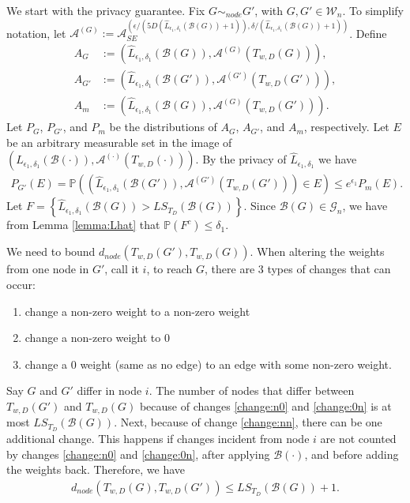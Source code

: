 \documentclass{article}
\begin{document}
We start with the privacy guarantee. Fix $G \sim_{node} G'$, with $G, G' \in \mathcal{W}_n$. To simplify notation, let $\mathcal{A}^{(G)} := \mathcal{A}_{SE}^{(\epsilon/(5D(\hat{L}_{\epsilon_1, \delta_1}(\mathcal{B}(G)) + 1)), \delta/(\hat{L}_{\epsilon_1, \delta_1}(\mathcal{B}(G)) + 1))}$. Define
\begin{align*}
A_G & := (\hat{L}_{\epsilon_1, \delta_1}(\mathcal{B}(G)), \mathcal{A}^{(G)}(T_{w, D}(G))), \\
%
A_{G'} & := (\hat{L}_{\epsilon_1, \delta_1}(\mathcal{B}(G')), \mathcal{A}^{(G')}(T_{w, D}(G'))), \\
%
A_m & := (\hat{L}_{\epsilon_1, \delta_1}(\mathcal{B}(G)), \mathcal{A}^{(G)}(T_{w, D}(G'))).
\end{align*}
Let $P_G$, $P_{G'}$, and $P_m$ be the distributions of $A_G$, $A_{G'}$, and $A_m$, respectively. 
Let $E$ be an arbitrary measurable set in the image of $(\hat{L}_{\epsilon_1, \delta_1}(\mathcal{B}(\cdot)), \mathcal{A}^{(\cdot)}( T_{w, D}(\cdot)))$. By the privacy of $\hat{L}_{\epsilon_1, \delta_1}$ we have
\begin{align*}
P_{G'}(E) = \mathbb{P}\left((\hat{L}_{\epsilon_1, \delta_1}(\mathcal{B}(G')), \mathcal{A}^{(G')}(T_{w,D}(G'))) \in E\right) \leq e^{\epsilon_1}P_m(E). 
\end{align*}
Let $F = \left\{\hat{L}_{\epsilon_1, \delta_1}(\mathcal{B}(G)) > LS_{T_{D}}(\mathcal{B}(G))\right\}$. Since $\mathcal{B}(G) \in \mathcal{G}_n$, we have from Lemma \ref{lemma:Lhat} that $\mathbb{P}(F^c) \leq \delta_1$. 

We need to bound $d_{node}(T_{w,D}(G'), T_{w,D}(G))$. When altering the weights from one node in $G'$, call it $i$, to reach $G$, there are $3$ types of changes that can occur:
\begin{enumerate}
    \item change a non-zero weight to a non-zero weight \label{change:nn}
    \item change a non-zero weight to $0$ \label{change:n0}
    \item change a $0$ weight (same as no edge) to an edge with some non-zero weight. \label{change:0n}
\end{enumerate}
Say $G$ and $G'$ differ in node $i$. The number of nodes that differ between $T_{w,D}(G')$ and $T_{w,D}(G)$ because of changes \ref{change:n0} and \ref{change:0n} is at most $LS_{T_{D}}(\mathcal{B}(G))$. Next, because of change \ref{change:nn}, there can be one additional change. This happens if changes incident from node $i$ are not counted by changes \ref{change:n0} and \ref{change:0n}, after applying $\mathcal{B}(\cdot)$, and before adding the weights back. Therefore, we have
\begin{align}
\label{eq:d_node_LST1}
d_{node}(T_{w,D}(G), T_{w,D}(G')) \leq LS_{T_{D}}(\mathcal{B}(G)) + 1.    
\end{align}
\end{document}
